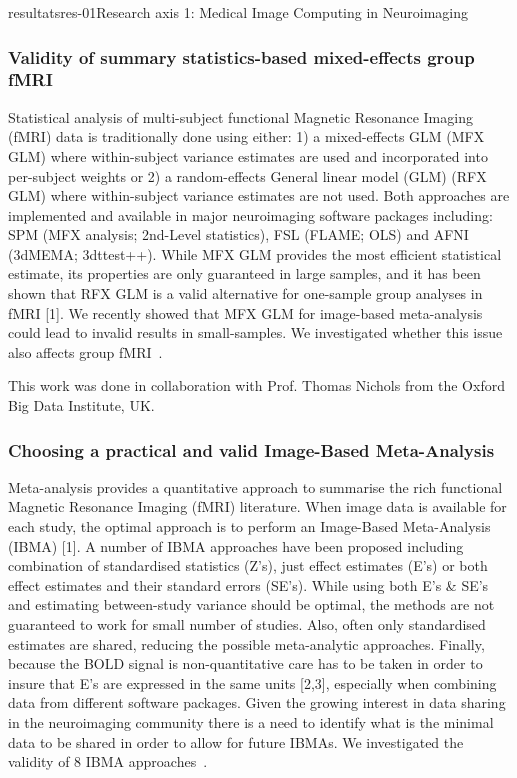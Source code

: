 \documentclass{ra2018}
\begin{document}
\begin{module}{resultats}{res-01}{Research axis 1: Medical Image Computing in Neuroimaging}
\subsubsection{Validity of summary statistics-based mixed-effects group fMRI}
\begin{participants}
\end{participants}
Statistical analysis of multi-subject functional Magnetic Resonance Imaging (fMRI) data is traditionally done using either: 1) a mixed-effects GLM (MFX GLM) where within-subject variance estimates are used and incorporated into per-subject weights or 2) a random-effects General linear model (GLM) (RFX GLM) where within-subject variance estimates are not used. Both approaches are implemented and available in major neuroimaging software packages including: SPM (MFX analysis; 2nd-Level statistics), FSL (FLAME; OLS) and AFNI (3dMEMA; 3dttest++). While MFX GLM provides the most efficient statistical estimate, its properties are only guaranteed in large samples, and it has been shown that RFX GLM is a valid alternative for one-sample group analyses in fMRI [1]. We recently showed that MFX GLM for image-based meta-analysis could lead to invalid results in small-samples. We investigated whether this issue also affects group fMRI~\cite{maumet:inserm-01887911}.

This work was done in collaboration with Prof. Thomas Nichols from the Oxford Big Data Institute, UK.

\subsubsection{Choosing a practical and valid Image-Based Meta-Analysis}
\begin{participants}
\end{participants}
Meta-analysis provides a quantitative approach to summarise the rich functional Magnetic Resonance Imaging (fMRI) literature. When image data is available for each study, the optimal approach is to perform an Image-Based Meta-Analysis (IBMA) [1]. A number of IBMA approaches have been proposed including combination of standardised statistics (Z's), just effect estimates (E's) or both effect estimates and their standard errors (SE's). While using both E’s \& SE’s and estimating between-study variance should be optimal, the methods are not guaranteed to work for small number of studies. Also, often only standardised estimates are shared, reducing the possible meta-analytic approaches. Finally, because the BOLD signal is non-quantitative care has to be taken in order to insure that E's are expressed in the same units [2,3], especially when combining data from different software packages. Given the growing interest in data sharing in the neuroimaging community there is a need to identify what is the minimal data to be shared in order to allow for future IBMAs. We investigated the validity of 8 IBMA approaches~\cite{maumet:inserm-01933032}.


\end{module}
\end{document}
